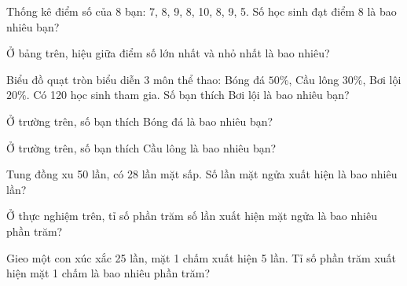 
\begin{ex}
  Thống kê điểm số của 8 bạn: 7, 8, 9, 8, 10, 8, 9, 5. Số học sinh đạt điểm 8 là bao nhiêu bạn?
\end{ex}

\begin{ex}
  Ở bảng trên, hiệu giữa điểm số lớn nhất và nhỏ nhất là bao nhiêu?
\end{ex}

\begin{ex}
  Biểu đồ quạt tròn biểu diễn 3 môn thể thao: Bóng đá $50\%$, Cầu lông $30\%$, Bơi lội $20\%$. Có 120 học sinh tham gia. Số bạn thích Bơi lội là bao nhiêu bạn?
\end{ex}

\begin{ex}
  Ở trường trên, số bạn thích Bóng đá là bao nhiêu bạn?
\end{ex}

\begin{ex}
  Ở trường trên, số bạn thích Cầu lông là bao nhiêu bạn?
\end{ex}

\begin{ex}
  Tung đồng xu 50 lần, có 28 lần mặt sấp. Số lần mặt ngửa xuất hiện là bao nhiêu lần?
\end{ex}

\begin{ex}
  Ở thực nghiệm trên, tỉ số phần trăm số lần xuất hiện mặt ngửa là bao nhiêu phần trăm?
\end{ex}

\begin{ex}
  Gieo một con xúc xắc 25 lần, mặt 1 chấm xuất hiện 5 lần. Tỉ số phần trăm xuất hiện mặt 1 chấm là bao nhiêu phần trăm?
\end{ex}

